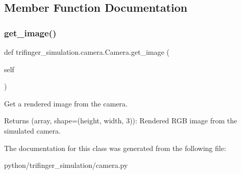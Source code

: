 \subsection{Member Function Documentation}
\mbox{\label{classtrifinger__simulation_1_1camera_1_1Camera_a6055089009e1f63df5ced179e5c56254}} 
\subsubsection{\texorpdfstring{get\+\_\+image()}{get\_image()}}
{\footnotesize\ttfamily def trifinger\+\_\+simulation.\+camera.\+Camera.\+get\+\_\+image (\begin{DoxyParamCaption}\item[{}]{self }\end{DoxyParamCaption})}



Get a rendered image from the camera. 

\begin{DoxyReturn}{Returns}
(array, shape=(height, width, 3))\+: Rendered R\+GB image from the simulated camera. 
\end{DoxyReturn}


The documentation for this class was generated from the following file\+:\begin{DoxyCompactItemize}
\item 
python/trifinger\+\_\+simulation/camera.\+py\end{DoxyCompactItemize}
